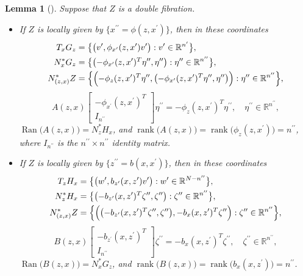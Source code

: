 \documentclass[a4paper,11pt,reqno]{amsart}
\newtheorem{lemma}[theorem]{Lemma}
\theoremstyle{definition}
\theoremstyle{remark}
\begin{document}
\begin{lemma}[{\cite[Lemmas~2.4, 2.5 and 2.6]{MazzucchelliSaloTzou}}]
\label{theorem:localexpression}
Suppose that $Z$ is a double fibration. 
%
%
\begin{itemize}
\item 
If $Z$ is locally given by $\{x^{\prime\prime}=\phi(z,x^\prime)\}$, then in these coordinates 
%
%
\begin{align*}
  T_xG_z
& =
  \bigl\{
  \bigl(v^\prime,\phi_{x^\prime}(z,x^\prime)v^\prime\bigr) 
  : 
  v^\prime \in \mathbb{R}^{n^\prime}
  \bigr\},
\\
  N^\ast_xG_z
& =
  \bigl\{
  \bigl(-\phi_{x^\prime}(z,x^\prime)^T\eta^{\prime\prime},\eta^{\prime\prime}\bigr)
  :
  \eta^{\prime\prime} \in \mathbb{R}^{n^{\prime\prime}}
  \bigr\},
\\
  N^\ast_{(z,x)}Z
& =
  \Bigl\{
  \Bigl(
  -\phi_z(z,x^\prime)^T\eta^{\prime\prime},
  \bigl(-\phi_{x^\prime}(z,x^\prime)^T\eta^{\prime\prime},\eta^{\prime\prime}\bigr)
  \Bigr)
  : 
  \eta^{\prime\prime} \in \mathbb{R}^{n^{\prime\prime}}  
  \Bigr\},     
\end{align*}
%
%
$$
A(z,x)
\begin{bmatrix}
-\phi_{x^\prime}(z,x^\prime)^T
\\
I_{n^{\prime\prime}} 
\end{bmatrix}
\eta^{\prime\prime}
=
-\phi_z(z,x^\prime)^T\eta^{\prime\prime},
\quad
\eta^{\prime\prime}\in\mathbb{R}^{n^{\prime\prime}},
$$
%
%
$\operatorname{Ran}\bigl(A(z,x)\bigr)=N^\ast_zH_x$, 
and $\operatorname{rank}\bigl(A(z,x)\bigr)=\operatorname{rank}\bigl(\phi_z(z,x^\prime)\bigr)=n^{\prime\prime}$, where $I_{n^{\prime\prime}}$ is the $n^{\prime\prime}{\times}n^{\prime\prime}$ identity matrix. 
\item 
If $Z$ is locally given by $\{z^{\prime\prime}=b(x,x^\prime)\}$, then in these coordinates 
%
%
\begin{align*}
  T_zH_x
& =
  \bigl\{
  \bigl(w^\prime,b_{z^\prime}(x,z^\prime)v^\prime\bigr) 
  : 
  w^\prime \in \mathbb{R}^{N-n^{\prime\prime}}
  \bigr\},
\\
  N^\ast_zH_x
& =
  \bigl\{
  \bigl(-b_{z^\prime}(x,z^\prime)^T\zeta^{\prime\prime},\zeta^{\prime\prime}\bigr)
  :
  \zeta^{\prime\prime} \in \mathbb{R}^{n^{\prime\prime}}
  \bigr\},
\\
  N^\ast_{(z,x)}Z
& =
  \Bigl\{
  \Bigl(
  \bigl(-b_{z^\prime}(x,z^\prime)^T\zeta^{\prime\prime},\zeta^{\prime\prime}\bigr),
   -b_x(x,z^\prime)^T\zeta^{\prime\prime}
  \Bigr)
  : 
  \zeta^{\prime\prime} \in \mathbb{R}^{n^{\prime\prime}}  
  \Bigr\},     
\end{align*}
%
%
$$
B(z,x)
\begin{bmatrix}
-b_{z^\prime}(x,z^\prime)^T
\\
I_{n^{\prime\prime}} 
\end{bmatrix}
\zeta^{\prime\prime}
=
-b_x(x,z^\prime)^T\zeta^{\prime\prime},
\quad
\zeta^{\prime\prime}\in\mathbb{R}^{n^{\prime\prime}},
$$
%
%
$\operatorname{Ran}\bigl(B(z,x)\bigr)=N^\ast_xG_z$, 
and $\operatorname{rank}\bigl(B(z,x)\bigr)=\operatorname{rank}\bigl(b_x(x,z^\prime)\bigr)=n^{\prime\prime}$.
\end{itemize}
%
% 
\end{lemma}
\end{document}

